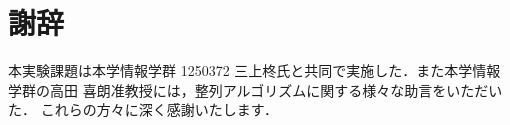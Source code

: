 \section*{謝辞}
本実験課題は本学情報学群 1250372 三上柊氏と共同で実施した．また本学情報学群の高田 喜朗准教授には，整列アルゴリズムに関する様々な助言をいただいた．
これらの方々に深く感謝いたします．